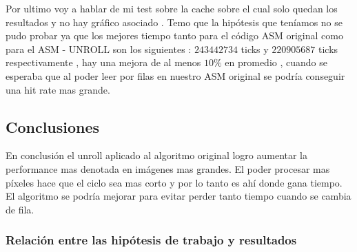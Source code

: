 Por ultimo voy a hablar de mi test sobre la cache sobre el cual solo quedan los resultados y no hay gráfico asociado . Temo que la  hipótesis que teníamos no se pudo probar ya que los mejores tiempo tanto para el código ASM original como para el ASM - UNROLL son los siguientes :  $243442734$ ticks y $220905687$ ticks respectivamente , hay una mejora de al menos $10\%$ en promedio , cuando se esperaba que al poder leer por filas en nuestro ASM original se podría conseguir una hit rate mas grande. 
\subsection{Conclusiones}
En conclusión el unroll aplicado al algoritmo original logro aumentar la performance mas denotada en imágenes mas grandes. El poder procesar mas píxeles hace que el ciclo sea mas corto y por lo tanto es ahí donde gana tiempo. El algoritmo se podría mejorar para evitar perder tanto tiempo cuando se cambia de fila.

\subsubsection*{Relación entre las hipótesis de trabajo y resultados}